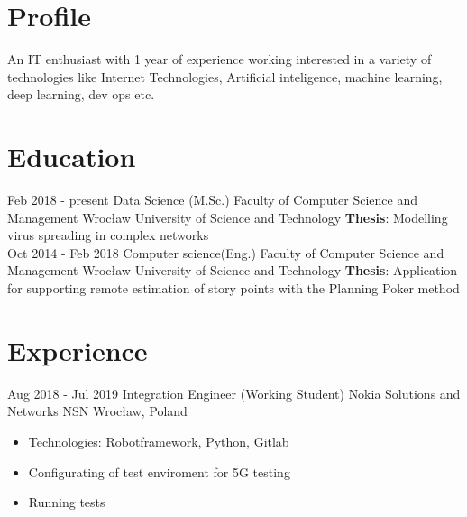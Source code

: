 \documentclass[letterpaper]{tenseconds} %
\begin{document}
\makeprofile %

\section{Profile}
\textnormal An IT enthusiast with 1 year of experience working interested in a variety of technologies like Internet Technologies, Artificial inteligence, machine learning, deep learning, dev ops etc.

\section{Education}
\begin{twenty} %
	\twentyitem
	{Feb 2018 -}
	{present}
	{Data Science (M.Sc.)}
	{Faculty of Computer Science and Management \href{https://wiz.pwr.edu.pl/}{\faExternalLink}}
	{Wrocław University of Science and Technology \href{https://pwr.edu.pl/}{\faExternalLink}}
	{
		\textbf{Thesis}: Modelling virus spreading in complex networks
	}
	{}
	{}
	\\
	\twentyitem
	{Oct 2014 -}
	{Feb 2018}
	{Computer science(Eng.)}
	{Faculty of Computer Science and Management \href{https://wiz.pwr.edu.pl/}{\faExternalLink}}
	{Wrocław University of Science and Technology \href{https://pwr.edu.pl/}{\faExternalLink}}
	{
		\textbf{Thesis}:  Application for supporting remote estimation of story points with the Planning Poker method
	}
	{}
	{}
\end{twenty}

\section{Experience}
\begin{twenty} %
	\twentyitem
	{Aug 2018 -}
	{Jul 2019}
	{Integration Engineer \textnormal{(Working Student)}}
	{Nokia Solutions and Networks \href{https://www.nokia.com/}{\faExternalLink}}
	{NSN Wrocław, Poland \href{https://nokiawroclaw.pl/}{\faExternalLink}}
	{\begin{itemize}
			\item Technologies: Robotframework, Python, Gitlab
			\item Configurating of test enviroment for 5G testing
			\item Running tests
		\end{itemize}}
\end{twenty}
\end{document}
